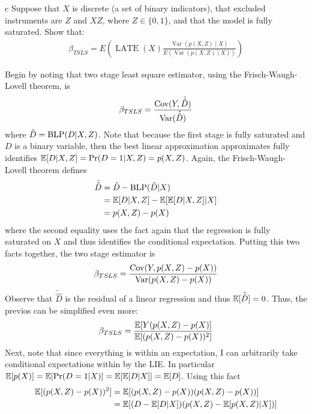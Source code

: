 \documentclass{article}
\begin{document}
\begin{problem}{c}
Suppose that $X$ is discrete (a set of binary indicators), that excluded instruments are $Z$ and $X Z$, where $Z \in\{0,1\}$, and that the model is fully saturated. Show that:
\begin{align*}
\beta_{T S L S}=E\left(\operatorname{LATE}(X) \frac{\operatorname{Var}(p(X, Z) \mid X)}{E(\operatorname{Var}(p(X, Z) \mid X))}\right)
\end{align*}
\end{problem}
\begin{solution}
Begin by noting that two stage least square estimator, using the Frisch-Waugh-Lovell theorem, is
\begin{equation*}
    \beta_{TSLS} = \frac{\text{Cov}(Y,\tilde{\hat{D}})}{\text{Var}(\tilde{\hat{D}})}
\end{equation*}
where $\hat{D}=\text{BLP}(D\vert X,Z)$. Note that because the first stage is fully saturated and $D$ is a binary variable, then the best linear approximation approximates fully identifies $\mathbb{E}[D\vert X,Z]=\Pr(D=1\vert X,Z) = p(X,Z)$. Again, the Frisch-Waugh-Lovell theorem defines
\begin{align*}
    \tilde{\hat{D}} &= \hat{D} - \text{BLP}(\hat{D}\vert X) \\ 
    &= \mathbb{E}[D\vert X,Z] - \mathbb{E}[\mathbb{E}[D\vert X,Z]\vert X] \\ 
    &= p(X,Z) - p(X)
\end{align*}
where the second equality uses the fact again that the regression is fully saturated on $X$ and thus identifies the conditional expectation. Putting this two facts together, the two stage estimator is 
\begin{align*}
    \beta_{TSLS} = \frac{\text{Cov}(Y,p(X,Z) - p(X))}{\text{Var}(p(X,Z) - p(X))}
\end{align*}
Observe that $\tilde{\hat{D}}$ is the residual of a linear regression and thus $\mathbb{E}[\tilde{\hat{D}}]=0$. Thus, the previos can be simplified even more:
\begin{equation*}
    \beta_{TSLS} = \frac{\mathbb{E}[Y(p(X,Z) - p(X)]}{\mathbb{E}[(p(X,Z) - p(X))^2]}
\end{equation*}
Next, note that since everything is within an expectation, I can arbitrarily take conditional expectations within by the LIE. In particular $\mathbb{E}[p(X)]=\mathbb{E}[\Pr(D=1\vert X)]=\mathbb{E}[\mathbb{E}[D\vert X]] = \mathbb{E}[D]$. Using this fact
\begin{align*}
    \E[(p(X,Z) - p(X))^2] &= \E[(p(X,Z) - p(X))(p(X,Z) - p(X))] \\ 
    &= \E[(D - \E[D\vert X])(p(X,Z) - \E[p(X,Z)\vert X])] \\ 

\end{align*}
\end{solution}
\end{document}
